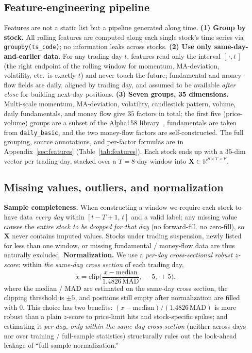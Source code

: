 \documentclass[a4paper,11pt]{article}
\begin{document}
\subsection{Feature-engineering pipeline}\label{sec:data-feat}
Features are not a static list but a pipeline generated along time.
\textbf{(1) Group by stock.} All rolling features are computed along
each single stock's time series via \texttt{groupby(ts\_code)}; no information
leaks across stocks. \textbf{(2) Use only same-day-and-earlier data.}
For any trading day $t$, features read only the interval $[\,\cdot,t\,]$ (the
right endpoint of the rolling window for momentum, MA-deviation, volatility,
etc.\ is exactly $t$) and never touch the future; fundamental and money-flow
fields are daily, aligned by trading day, and assumed to be available
\emph{after close} for building next-day positions. \textbf{(3) Seven
groups, 35 dimensions.} Multi-scale momentum, MA-deviation, volatility,
candlestick pattern, volume, daily fundamentals, and money flow give $35$
factors in total; the first five (price-volume) groups are a subset of the
Alpha158 library~\cite{qlib}, fundamentals are taken from
\texttt{daily\_basic}, and the two money-flow factors are self-constructed. The
full grouping, source annotations, and per-factor formulas are in
Appendix~\ref{sec:features} (Table~\ref{tab:features}). Each stock ends up with
a $35$-dim vector per trading day, stacked over a $T{=}8$-day window into
$\bm{X}\in\mathbb{R}^{S\times T\times F}$.

\subsection{Missing values, outliers, and normalization}\label{sec:data-norm}
\textbf{Sample completeness.} When constructing a window we require each
stock to have data \emph{every day} within $[t{-}T{+}1,\,t]$ and a valid label;
any missing value causes the \emph{entire stock to be dropped for that day} (no
forward-fill, no zero-fill), so $\bm{X}$ never contains imputed values. Stocks
under trading suspension, newly listed for less than one window, or missing
fundamental / money-flow data are thus naturally excluded.
\textbf{Normalization.} We use a \emph{per-day cross-sectional robust
$z$-score}: within \emph{the same-day cross section} of each trading day,
\begin{equation}\label{eq:zscore}
\tilde{x} = \mathrm{clip}\!\Big(\frac{x-\mathrm{median}}{1.4826\,\mathrm{MAD}},\,-5,\,+5\Big),
\end{equation}
where the median / MAD are estimated on the same-day cross section, the
clipping threshold is $\pm5$, and positions still empty after normalization are
filled with $0$. This choice has two benefits: $(x-\mathrm{median})/(1.4826\,\mathrm{MAD})$
is more robust than a plain $z$-score to price-limit hits and stock-specific
spikes; and estimating it \emph{per day, only within the same-day cross
section} (neither across days nor over training / full-sample statistics)
structurally rules out the look-ahead leakage of ``full-sample normalization.''
\end{document}
